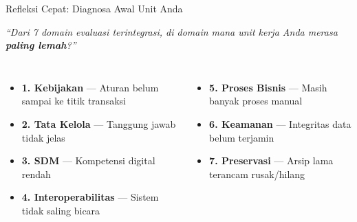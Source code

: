 \documentclass[aspectratio=169,11pt]{beamer}
\begin{document}
\begin{frame}{Refleksi Cepat: Diagnosa Awal Unit Anda}
    \vspace{0.3cm}
    \begin{premiumbox}
        \large
        \centering
        \textit{``Dari 7 domain evaluasi terintegrasi, di domain mana unit kerja Anda merasa \textbf{paling lemah}?''}
    \end{premiumbox}
    \vspace{0.3cm}
    \begin{columns}[T]
        \begin{itemize}
            \scriptsize
            \item[$\square$] \textbf{1. Kebijakan} --- Aturan belum sampai ke titik transaksi
            \item[$\square$] \textbf{2. Tata Kelola} --- Tanggung jawab tidak jelas
            \item[$\square$] \textbf{3. SDM} --- Kompetensi digital rendah
            \item[$\square$] \textbf{4. Interoperabilitas} --- Sistem tidak saling bicara
        \end{itemize}
        
        \begin{itemize}
            \scriptsize
            \item[$\square$] \textbf{5. Proses Bisnis} --- Masih banyak proses manual
            \item[$\square$] \textbf{6. Keamanan} --- Integritas data belum terjamin
            \item[$\square$] \textbf{7. Preservasi} --- Arsip lama terancam rusak/hilang
        \end{itemize}
    \end{columns}

\end{frame}
\end{document}
